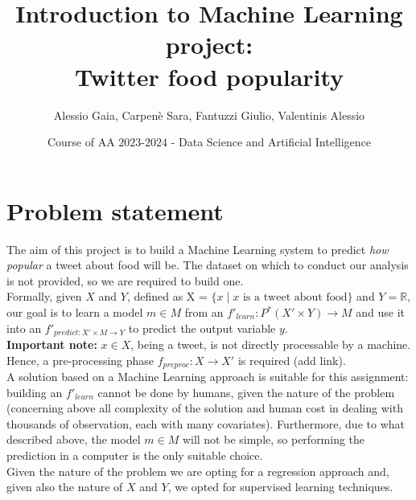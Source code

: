 \documentclass{article}
\title{Introduction to Machine Learning project:\\Twitter food popularity}
\author[*]{Alessio Gaia, Carpenè Sara, Fantuzzi Giulio, Valentinis Alessio}
\affil[*]{
    problem statement,
    solution design,
    solution development,
    data gathering,
    writing
}
\date{Course of AA $2023$-$2024$ - Data Science and Artificial Intelligence}
\begin{document}
\maketitle



\section{Problem statement}
\label{sec:problem_statement}
The aim of this project is to build a Machine Learning system to predict \textit{how popular} a tweet about food will be.
The dataset on which to conduct our analysis is not provided, so we are required to build one.\\
Formally, given $X$ and $Y$, defined as X = $\{x \mid x \text{ is a tweet about food}\}$ and $Y=\mathbb{R}$, our goal is to learn a model $m \in M$ from an $f'_{learn}: P^{*}(X' \times Y) \rightarrow M$ and use it into an $f'_{predict: X' \times M \rightarrow Y}$ to predict the output variable $y$.\\[0.2cm]
\textbf{Important note:} $x \in X$, being a tweet, is not directly processable by a machine. Hence, a pre-processing phase $f_{preproc}: X \rightarrow X'$ is required (add link).\\[0.2cm]
A solution based on a Machine Learning approach is suitable for this assignment: building an $f'_{learn}$ cannot be done by humans, given the nature of the problem (concerning above all complexity of the solution and human cost in dealing with thousands of observation, each with many covariates).
Furthermore, due to what described above, the model $m \in M$ will not be simple, so performing the prediction in a computer is the only suitable choice.\\
Given the nature of the problem we are opting for a regression approach and, given also the nature of $X$ and $Y$, we opted for supervised learning techniques.

\end{document}
